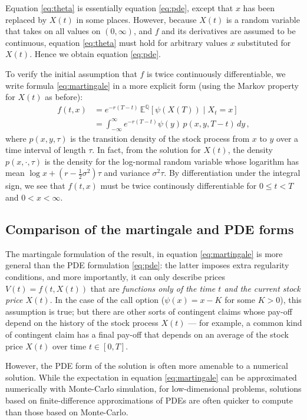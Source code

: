 \documentclass[12pt]{article}
\newcommand{\EQ}{\mathbb{E}^\mathbb{Q}}
\begin{document}
Equation \eqref{eq:theta}
is essentially equation \eqref{eq:pde},
except that $x$ has been replaced by $X(t)$ in some places.
However,
because $X(t)$ is a random variable that takes on all values on $(0, \infty)$,
and $f$ and its derivatives are assumed to be continuous,
equation \eqref{eq:theta} must hold for arbitrary values $x$
substituted for $X(t)$.  Hence we obtain equation \eqref{eq:pde}.

To verify 
the initial assumption that $f$ is twice continuously differentiable,
we write formula \eqref{eq:martingale}
in a more explicit form (using the Markov property for $X(t)$ as before):
\begin{align*}
f(t,x) &= e^{-r(T-t)} \, \EQ[\psi(X(T)) \mid X_t = x] \\
&= \int_{-\infty}^\infty e^{-r(T-t)} \psi(y) \, p(x, y, T-t) \, dy\,,
\end{align*}
where $p(x,y,\tau)$ is the transition density of the 
stock process from $x$ to $y$ over a time interval of length $\tau$.
In fact, from the solution for $X(t)$,
the density $p(x, \cdot, \tau)$
is the density for the log-normal random variable
whose logarithm has mean $\log x + (r-\tfrac12 \sigma^2)\tau$
and variance $\sigma^2 \tau$.
By differentiation under the integral sign,
we see that $f(t,x)$ must be twice continously differentiable
for $0 \leq t < T$ and $0 < x < \infty$.

\subsection{Comparison of the martingale and PDE forms}

The martingale formulation of the result,
 in equation \eqref{eq:martingale}
is more general than the PDE formulation \eqref{eq:pde}:
the latter imposes extra regularity conditions,
and more importantly,
it can only describe prices $V(t) = f(t,X(t))$
that are
\emph{functions only of the time $t$ and the current stock price $X(t)$}.
In the case of the call option ($\psi(x) = x- K$ for some $K > 0$),
this  assumption is true;
but there are other sorts of contingent claims
whose pay-off depend on the history of the stock process $X(t)$ ---
for example, a common kind of contingent claim has a final
pay-off that depends on an average
of the stock price $X(t)$ over time $t \in [0,T]$.

However, the PDE form of the solution is often more
amenable to a numerical solution.
While the expectation in equation \eqref{eq:martingale}
can be approximated numerically
with Monte-Carlo simulation,
for low-dimensional problems,
solutions based on finite-difference approximations
of PDEs are often quicker to compute than those based on Monte-Carlo.
\end{document}
